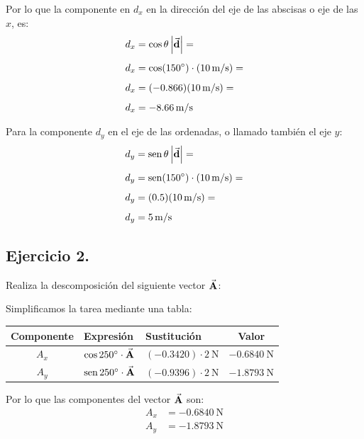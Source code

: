 \documentclass[14pt]{extarticle}
\renewcommand{\sin}{\operatorname{sen}}
\begin{document}
Por lo que la componente en $d_{x}$ en la dirección del eje de las abscisas o eje de las $x$, es:
\begin{align*}
d_{x} &= \cos \theta \, \abs{\va{d}} =  \\[0.5em]
d_{x} &= \cos (\ang{150}) \cdot (\SI[per-mode=symbol]{10}{\meter\per\second}) = \\[0.5em]
d_{x} &=  (-0.866) (\SI[per-mode=symbol]{10}{\meter\per\second}) = \\[0.5em]
d_{x} &= - \SI[per-mode=symbol]{8.66}{\meter\per\second}
\end{align*}

Para la componente $d_{y}$ en el eje de las ordenadas, o llamado también el eje $y$:
\begin{align*}
d_{y} &= \sin \theta \, \abs{\va{d}} = \\[0.5em] 
d_{y} &= \sin (\ang{150}) \cdot (\SI[per-mode=symbol]{10}{\meter\per\second}) = \\[0.5em] 
d_{y} &= (0.5) (\SI[per-mode=symbol]{10}{\meter\per\second}) = \\[0.5em] 
d_{y} &= \SI[per-mode=symbol]{5}{\meter\per\second}
\end{align*}

\subsection{Ejercicio 2.}

Realiza la descomposición del siguiente vector $\va{A}$:
\begin{figure}[H]
    \centering
\end{figure}
Simplificamos la tarea mediante una tabla:
\begin{table}[H]
\centering
\begin{tabular}{c | l | l | c}
Componente & Expresión & Sustitución & Valor \\ \hline
$A_{x}$ & $\cos \ang{250} \cdot \va{A}$ & $(-0.3420) \cdot \SI{2}{\newton}$ & $\SI{-0.6840}{\newton}$ \\ \hline
$A_{y}$ & $\sin \ang{250} \cdot \va{A}$ & $(-0.9396) \cdot \SI{2}{\newton}$ & $\SI{-1.8793}{\newton}$ \\ \hline
\end{tabular}
\end{table}
Por lo que las componentes del vector $\va{A}$ son:
\begin{align*}
A_{x} &= \SI{-0.6840}{\newton} \\
A_{y} &= \SI{-1.8793}{\newton}
\end{align*}
\end{document}
